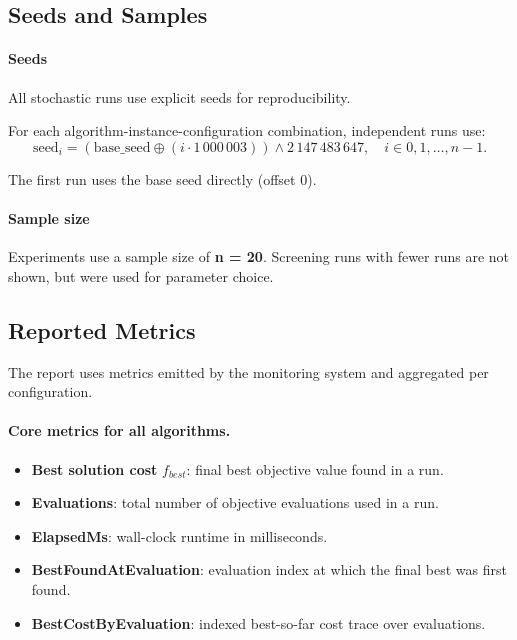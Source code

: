 \documentclass[12pt,a4paper]{report}
\begin{document}
\subsection{Seeds and Samples}

\paragraph{Seeds} All stochastic runs use explicit seeds for reproducibility.

For each algorithm-instance-configuration combination, independent runs use:
\[
\text{seed}_i = (\text{base\_seed} \oplus (i\cdot 1\,000\,003)) \wedge 2\,147\,483\,647, \quad i \in 0,1,\dots,n-1.
\]

The first run uses the base seed directly (offset \(0\)).

\paragraph{Sample size} Experiments use a sample size of \textbf{n = 20}. Screening runs with fewer runs are not shown, but were used for parameter choice.

\subsection{Reported Metrics}
The report uses metrics emitted by the monitoring system and aggregated per configuration.

\paragraph{Core metrics for all algorithms.}
\begin{itemize}
    \item \textbf{Best solution cost} \(f_{best}\): final best objective value found in a run.
    \item \textbf{Evaluations}: total number of objective evaluations used in a run.
    \item \textbf{ElapsedMs}: wall-clock runtime in milliseconds.
    \item \textbf{BestFoundAtEvaluation}: evaluation index at which the final best was first found.
    \item \textbf{BestCostByEvaluation}: indexed best-so-far cost trace over evaluations.
\end{itemize}
\end{document}
